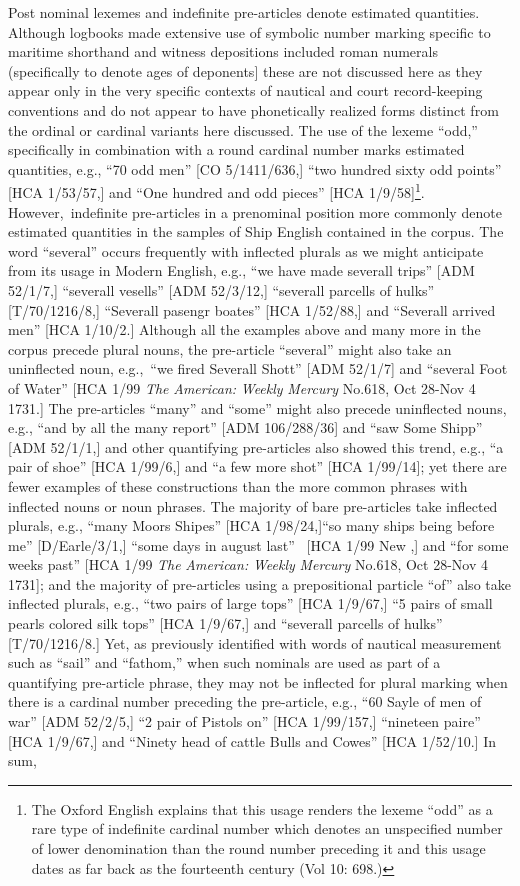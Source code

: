 Post nominal lexemes and indefinite pre-articles denote estimated quantities. Although logbooks made extensive use of symbolic number marking specific to maritime shorthand and witness depositions included roman numerals (specifically to denote ages of deponents] these are not discussed here as they appear only in the very specific contexts of nautical and court record-keeping conventions and do not appear to have phonetically realized forms distinct from the ordinal or cardinal variants here discussed.  The use of the lexeme “odd,” specifically in combination with a round cardinal number marks estimated quantities, e.g., “70 odd men” [CO 5/1411/636,] “two hundred sixty odd points” [HCA 1/53/57,] and “One hundred and odd pieces” [HCA 1/9/58]\footnote{The Oxford English \citet{Dictionary1989} explains that this usage renders the lexeme “odd” as a rare type of indefinite cardinal number which denotes an unspecified number of lower denomination than the round number preceding it and this usage dates as far back as the fourteenth century (Vol 10: 698.)}.  However,~indefinite pre-articles in a prenominal position more commonly denote estimated quantities in the samples of Ship English contained in the corpus. The word “several” occurs frequently with inflected plurals as we might anticipate from its usage in Modern English, e.g., “we have made severall trips” [ADM 52/1/7,] “severall vesells” [ADM 52/3/12,] “severall parcells of hulks” [T/70/1216/8,] “Severall pasengr boates” [HCA 1/52/88,] and “Severall arrived men” [HCA 1/10/2.] Although all the examples above and many more in the corpus precede plural nouns, the pre-article “several” might also take an uninflected noun, e.g.,~“we fired Severall Shott” [ADM 52/1/7] and “several Foot of Water” [HCA 1/99 \textit{The} \textit{American:} \textit{Weekly} \textit{Mercury} No.618, Oct 28-Nov 4 1731.] The pre-articles “many” and “some” might also precede uninflected nouns, e.g., “and by all the many report” [ADM 106/288/36] and “saw Some Shipp” [ADM 52/1/1,] and other quantifying pre-articles also showed this trend, e.g., “a pair of shoe” [HCA 1/99/6,] and “a few more shot” [HCA 1/99/14]; yet there are fewer examples of these constructions than the more common phrases with inflected nouns or noun phrases. The majority of bare pre-articles take inflected plurals, e.g., “many Moors Shipes” [HCA 1/98/24,]“so many ships being before me” [D/Earle/3/1,] “some days in august last” ~[HCA 1/99 New \citealt{Providence1722},] and “for some weeks past” [HCA 1/99 \textit{The} \textit{American:} \textit{Weekly} \textit{Mercury} No.618, Oct 28-Nov 4 1731]; and the majority of pre-articles using a prepositional particle “of” also take inflected plurals, e.g., “two pairs of large tops” [HCA 1/9/67,] “5 pairs of small pearls colored silk tops” [HCA 1/9/67,] and “severall parcells of hulks” [T/70/1216/8.] Yet, as previously identified with words of nautical measurement such as “sail” and “fathom,” when such nominals are used as part of a quantifying pre-article phrase, they may not be inflected for plural marking when there is a cardinal number preceding the pre-article, e.g., “60 Sayle of men of war” [ADM 52/2/5,] “2 pair of Pistols on” [HCA 1/99/157,] “nineteen paire” [HCA 1/9/67,] and “Ninety head of cattle Bulls and Cowes” [HCA 1/52/10.] In sum, 